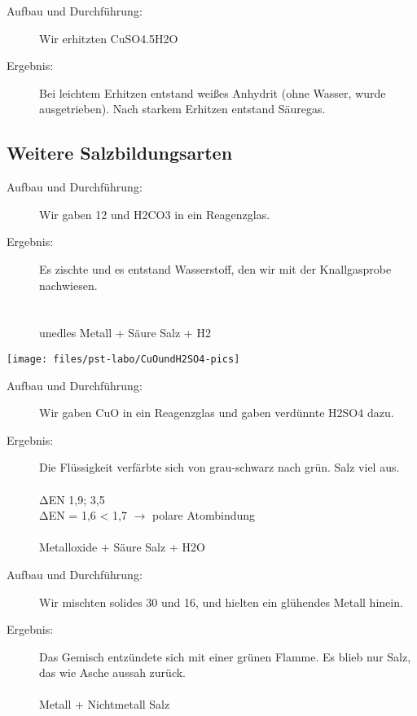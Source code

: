 \begin{description}
   \item[Aufbau und Durchführung:] Wir erhitzten \ac{CuSO4.5H2O}
   \item[Ergebnis:] Bei leichtem Erhitzen entstand weißes Anhydrit (ohne Wasser, wurde ausgetrieben). Nach starkem Erhitzen entstand Säuregas.
\end{description}

\subsection{Weitere Salzbildungsarten}
\begin{description}
   \item[Aufbau und Durchführung:] Wir gaben \ac{12} und \ac{H2CO3} in ein Reagenzglas.
   \item[Ergebnis:] Es zischte und es entstand Wasserstoff, den wir mit der Knallgasprobe nachwiesen. \\
    \\
    \\
   unedles Metall + Säure \ce{->} Salz + \acl{H2}
\end{description}

\begin{center}
\texttt{[image: files/pst-labo/CuOundH2SO4-pics]}
\end{center}


\begin{description}
   \item[Aufbau und Durchführung:] Wir gaben \ac{CuO} in ein Reagenzglas und gaben verdünnte \ac{H2SO4} dazu.
   \item[Ergebnis:] Die Flüssigkeit verfärbte sich von grau-schwarz nach grün. Salz viel aus. \\
    \\
   $\mathrm{\Delta}$EN 1,9; 3,5 \\
   $\mathrm{\Delta}$EN = 1,6 < 1,7 $\rightarrow$ polare Atombindung \\
    \\
   Metalloxide + Säure \ce{->} Salz + \acl{H2O}
\end{description}

\begin{description}
   \item[Aufbau und Durchführung:] Wir mischten solides \ac{30} und \ac{16}, und hielten ein glühendes Metall hinein.
   \item[Ergebnis:] Das Gemisch entzündete sich mit einer grünen Flamme. Es blieb nur Salz, das wie Asche aussah zurück. \\
    \\
   Metall + Nichtmetall \ce{->} Salz
\end{description}

